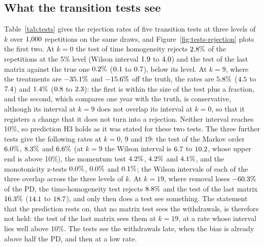 \subsection{What the transition tests see}
\label{sec:results-tests}

Table~\ref{tab:tests} gives the rejection rates of five transition tests at three levels of $k$ over $1{,}000$ repetitions on the same draws, and Figure~\ref{fig:tests-rejection} plots the first two. At $k=0$ the test of time homogeneity rejects $2.8\%$ of the repetitions at the 5\% level (Wilson interval $1.9$ to $4.0$) and the test of the last matrix against the true one $0.2\%$ ($0.1$ to $0.7$), below its level. At $k=9$, where the treatments are $-35.1\%$ and $-15.6\%$ off the truth, the rates are $5.8\%$ ($4.5$ to $7.4$) and $1.4\%$ ($0.8$ to $2.3$): the first is within the size of the test plus a fraction, and the second, which compares one year with the truth, is conservative, although its interval at $k=9$ does not overlap its interval at $k=0$, so that it registers a change that it does not turn into a rejection. Neither interval reaches 10\%, so prediction H3 holds as it was stated for these two tests. The three further tests give the following rates at $k=0$, $9$ and $19$: the test of the Markov order $6.0\%$, $8.3\%$ and $6.6\%$ (at $k=9$ the Wilson interval is $6.7$ to $10.2$, whose upper end is above 10\%), the momentum test $4.2\%$, $4.2\%$ and $4.1\%$, and the monotonicity z-tests $0.0\%$, $0.0\%$ and $0.1\%$; the Wilson intervals of each of the three overlap across the three levels of $k$. At $k=19$, where removal loses $-60.3\%$ of the PD, the time-homogeneity test rejects $8.8\%$ and the test of the last matrix $16.3\%$ ($14.1$ to $18.7$), and only then does a test see something. The statement that the prediction rests on, that no matrix test sees the withdrawals, is therefore not held: the test of the last matrix sees them at $k=19$, at a rate whose interval lies well above 10\%. The tests see the withdrawals late, when the bias is already above half the PD, and then at a low rate.



